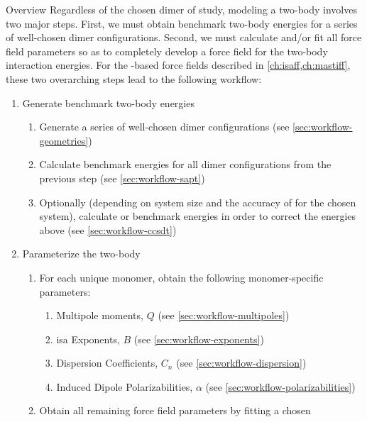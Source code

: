 \begin{section}{Overview}
Regardless of the chosen dimer of study, modeling a 
two-body \pes involves two major steps.  First, we must
obtain benchmark two-body energies for a series of well-chosen dimer
configurations. Second, we must
calculate and/or fit all force field parameters so as to completely develop a
force field for the two-body interaction energies. For the \sapt-based force fields described in
\cref{ch:isaff,ch:mastiff}, 
these two overarching steps lead to the following workflow:
%
\begin{minipage}{\linewidth}
\begin{enumerate}[label=\Roman*)]
\item Generate benchmark two-body energies
\label{workflow:step1}
    \begin{enumerate}[label=\arabic*)]
    \item Generate a series of well-chosen dimer configurations
        (see \cref{sec:workflow-geometries})
    \item Calculate \dftsapt benchmark energies for all dimer configurations from
the previous step
        (see \cref{sec:workflow-sapt})
    \item Optionally (depending on system size and the accuracy of \dftsapt
for the chosen system), calculate \ccsdt or \ccsdtf benchmark energies in
order to correct the \dftsapt energies above
        (see \cref{sec:workflow-ccsdt})
    \end{enumerate}
\item Parameterize the two-body \pes
\label{workflow:step2}
    \begin{enumerate}[label=\arabic*)]
    \item For each unique monomer, obtain the following monomer-specific parameters:
        \begin{enumerate}
        \item Multipole moments, $Q$
            (see \cref{sec:workflow-multipoles})
        \item \acrshort{isa} Exponents, $B$ 
            (see \cref{sec:workflow-exponents})
        \item Dispersion Coefficients, $C_n$
            (see \cref{sec:workflow-dispersion})
        \item Induced Dipole Polarizabilities, $\alpha$
            (see \cref{sec:workflow-polarizabilities})
        \end{enumerate}
    \item Obtain all remaining force field parameters by fitting a chosen

\end{enumerate}
\end{enumerate}
\end{minipage}
\end{section}
